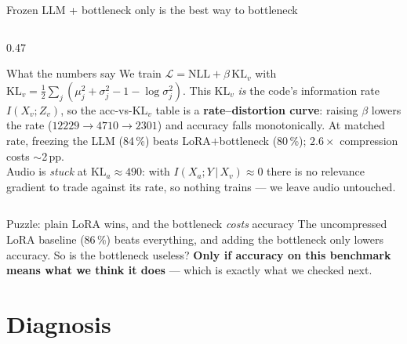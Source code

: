 \documentclass[10pt,aspectratio=169]{beamer}
\begin{document}
\begin{frame}{Frozen LLM + bottleneck only is the best way to bottleneck}
\begin{columns}[T]
\begin{column}{0.47\textwidth}
\begin{block}{What the numbers say}
{\footnotesize
We train $\mathcal L=\text{NLL}+\beta\,\mathrm{KL}_v$ with
$\mathrm{KL}_v=\tfrac12\sum_j(\mu_j^2+\sigma_j^2-1-\log\sigma_j^2)$. This
$\mathrm{KL}_v$ \emph{is} the code's information rate $I(X_v;Z_v)$, so the
acc-vs-$\mathrm{KL}_v$ table is a \textbf{rate--distortion curve}: raising
$\beta$ lowers the rate ($12229\!\to\!4710\!\to\!2301$) and accuracy falls
monotonically. At matched rate, freezing the LLM (84\,\%) beats LoRA$+$bottleneck
(80\,\%); $2.6\times$ compression costs $\sim$2\,pp.\\[3pt]
Audio is \emph{stuck} at $\mathrm{KL}_a\!\approx\!490$: with
$I(X_a;Y\,|\,X_v)\!\approx\!0$ there is no relevance gradient to trade against
its rate, so nothing trains --- we leave audio untouched.}
\end{block}

\end{column}
\end{columns}

\vspace{2pt}
\begin{block}{Puzzle: plain LoRA wins, and the bottleneck \emph{costs} accuracy}
{\footnotesize
The uncompressed LoRA baseline (86\,\%) beats everything, and adding the
bottleneck only lowers accuracy. So is the bottleneck useless? \textbf{Only if
accuracy on this benchmark means what we think it does} --- which is exactly
what we checked next.}
\end{block}

\end{frame}

\section{Diagnosis}
\end{document}
